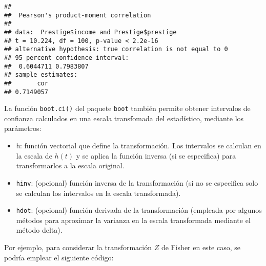 \documentclass[]{book}
\newenvironment{Shaded}{\begin{snugshade}}{\end{snugshade}}
\newcommand{\KeywordTok}[1]{\textcolor[rgb]{0.13,0.29,0.53}{\textbf{#1}}}
\newcommand{\DataTypeTok}[1]{\textcolor[rgb]{0.13,0.29,0.53}{#1}}
\newcommand{\DecValTok}[1]{\textcolor[rgb]{0.00,0.00,0.81}{#1}}
\newcommand{\StringTok}[1]{\textcolor[rgb]{0.31,0.60,0.02}{#1}}
\newcommand{\CommentTok}[1]{\textcolor[rgb]{0.56,0.35,0.01}{\textit{#1}}}
\newcommand{\ControlFlowTok}[1]{\textcolor[rgb]{0.13,0.29,0.53}{\textbf{#1}}}
\newcommand{\OperatorTok}[1]{\textcolor[rgb]{0.81,0.36,0.00}{\textbf{#1}}}
\newcommand{\NormalTok}[1]{#1}
\theoremstyle{break}
\theoremstyle{definition}
\theoremstyle{definition}
\theoremstyle{definition}
\theoremstyle{remark}
\begin{document}
\begin{verbatim}
## 
##  Pearson's product-moment correlation
## 
## data:  Prestige$income and Prestige$prestige
## t = 10.224, df = 100, p-value < 2.2e-16
## alternative hypothesis: true correlation is not equal to 0
## 95 percent confidence interval:
##  0.6044711 0.7983807
## sample estimates:
##       cor 
## 0.7149057
\end{verbatim}

La función \texttt{boot.ci()} del paquete \texttt{boot} también permite
obtener intervalos de confianza calculados en una escala transfomada del
estadístico, mediante los parámetros:

\begin{itemize}
\item
  \texttt{h}: función vectorial que define la transformación. Los
  intervalos se calculan en la escala de \(h(t)\) y se aplica la función
  inversa (si se especifica) para transformarlos a la escala original.
\item
  \texttt{hinv}: (opcional) función inversa de la transformación (si no
  se especifica solo se calculan los intervalos en la escala
  transformada).
\item
  \texttt{hdot}: (opcional) función derivada de la transformación
  (empleada por algunos métodos para aproximar la varianza en la escala
  transformada mediante el método delta).
\end{itemize}

Por ejemplo, para considerar la transformación \(Z\) de Fisher en este
caso, se podría emplear el siguiente código:

\begin{Shaded}
\end{Shaded}
\end{document}
